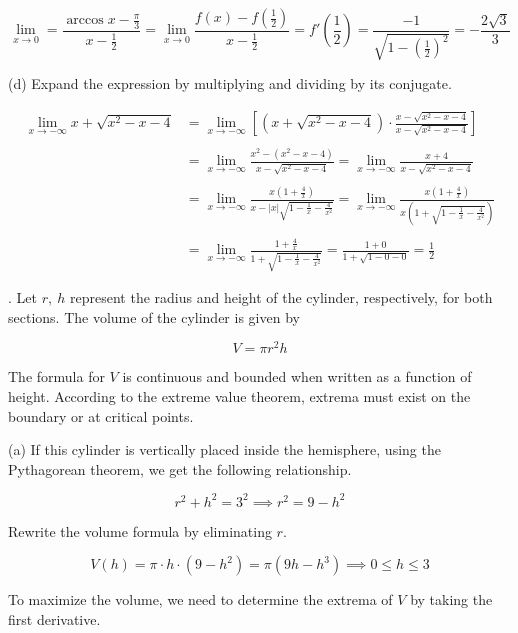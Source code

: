 \documentclass{article}
\begin{document}
\[\lim_{x\to0}=\frac{\arccos x -\frac\pi3}{x-\frac12}=\lim_{x\to0}\frac{f(x)-f\left(\frac12\right)}{x-\frac12}=f'\left(\frac12\right)=\frac{-1}{\sqrt{1-\left(\frac12\right)^2}}=\boxed{-\frac{2\sqrt3}{3}}\]

\newpage

\noindent (d) Expand the expression by multiplying and dividing by its conjugate.

\begin{align*}\lim_{x\to-\infty}x+\sqrt{x^2-x-4}&=\lim_{x\to-\infty}\left[\left(x+\sqrt{x^2-x-4}\right)\cdot\frac{x-\sqrt{x^2-x-4}}{x-\sqrt{x^2-x-4}}\right]\\\\&=\lim_{x\to-\infty}\frac{x^2-\left(x^2-x-4\right)}{x-\sqrt{x^2-x-4}}=\lim_{x\to-\infty}\frac{x+4}{x-\sqrt{x^2-x-4}}\\\\&=\lim_{x\to-\infty}\frac{x\left(1+\frac4x\right)}{x-\left|x\right|\sqrt{1-\frac1x-\frac4{x^2}}}=\lim_{x\to-\infty}\frac{x\left(1+\frac4x\right)}{x\left(1+\sqrt{1-\frac1x-\frac4{x^2}}\right)}\\\\&=\lim_{x\to-\infty}\frac{1+\frac4x}{1+\sqrt{1-\frac1x-\frac4{x^2}}}=\frac{1+0}{1+\sqrt{1-0-0}}=\boxed{\frac12}\end{align*}

\hfill

. Let $r,\:h$ represent the radius and height of the cylinder, respectively, for both sections. The volume of the cylinder is given by

\[V=\pi r^2h\]

\noindent The formula for $V$ is continuous and bounded when written as a function of height. According to the extreme value theorem, extrema must exist on the boundary or at critical points.

\hfill

\noindent (a) If this cylinder is vertically placed inside the hemisphere, using the Pythagorean theorem, we get the following relationship.

\[r^2+h^2=3^2\implies r^2=9-h^2\]

\hfill

\noindent Rewrite the volume formula by eliminating $r$.

\[V(h)=\pi\cdot h\cdot(9-h^2)=\pi\left(9h-h^3\right)\implies 0\leq h\leq3\]

\hfill

\noindent To maximize the volume, we need to determine the extrema of $V$ by taking the first derivative.
\end{document}
